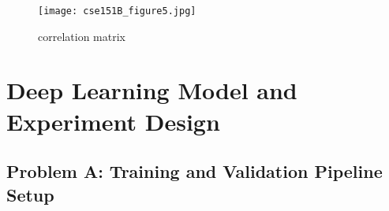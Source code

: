 \documentclass{article}
\begin{document}



\begin{figure}[h!]
  \centering
  \texttt{[image: cse151B\_figure5.jpg]} %
  \caption{correlation matrix}
  \label{fig:bonus_analysis}
\end{figure}


\section{Deep Learning Model and Experiment Design}

\subsection{Problem A: Training and Validation Pipeline Setup}
\end{document}

